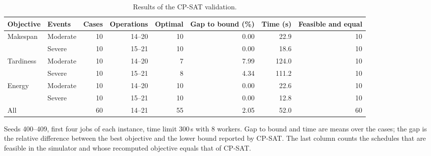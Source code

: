 \begin{table}
\centering
\begin{threeparttable}
\caption{Results of the CP-SAT validation.}
\label{tab:cpsat}
\footnotesize
\setlength{\tabcolsep}{4pt}
\begin{tabular*}{\textwidth}{@{\extracolsep{\fill}}llrrrrrr@{}}
\toprule
Objective & Events & Cases & Operations & Optimal & Gap to bound (\%) & Time (s) & Feasible and equal \\
\midrule
Makespan & Moderate & 10 & 14--20 & 10 & 0.00 & 22.9 & 10 \\
 & Severe & 10 & 15--21 & 10 & 0.00 & 18.6 & 10 \\
Tardiness & Moderate & 10 & 14--20 & 7 & 7.99 & 124.0 & 10 \\
 & Severe & 10 & 15--21 & 8 & 4.34 & 111.2 & 10 \\
Energy & Moderate & 10 & 14--20 & 10 & 0.00 & 22.6 & 10 \\
 & Severe & 10 & 15--21 & 10 & 0.00 & 12.8 & 10 \\
\midrule
All & & 60 & 14--21 & 55 & 2.05 & 52.0 & 60 \\
\bottomrule
\end{tabular*}
\begin{tablenotes}\footnotesize
\item Seeds 400--409, first four jobs of each instance, time limit 300\,s with 8 workers. Gap to bound and time are means over the cases; the gap is the relative difference between the best objective and the lower bound reported by CP-SAT. The last column counts the schedules that are feasible in the simulator and whose recomputed objective equals that of CP-SAT.
\end{tablenotes}
\end{threeparttable}
\end{table}
